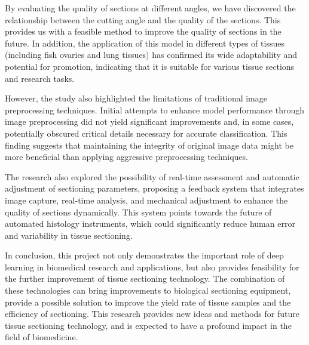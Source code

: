 By evaluating the quality of sections at different angles, we have discovered the relationship between the cutting angle and the quality of the sections. This provides us with a feasible method to improve the quality of sections in the future. In addition, the application of this model in different types of tissues (including fish ovaries and lung tissues) has confirmed its wide adaptability and potential for promotion, indicating that it is suitable for various tissue sections and research tasks.

However, the study also highlighted the limitations of traditional image preprocessing techniques. Initial attempts to enhance model performance through image preprocessing did not yield significant improvements and, in some cases, potentially obscured critical details necessary for accurate classification. This finding suggests that maintaining the integrity of original image data might be more beneficial than applying aggressive preprocessing techniques.

The research also explored the possibility of real-time assessment and automatic adjustment of sectioning parameters, proposing a feedback system that integrates image capture, real-time analysis, and mechanical adjustment to enhance the quality of sections dynamically. This system points towards the future of automated histology instruments, which could significantly reduce human error and variability in tissue sectioning.

In conclusion, this project not only demonstrates the important role of deep learning in biomedical research and applications, but also provides feasibility for the further improvement of tissue sectioning technology. The combination of these technologies can bring improvements to biological sectioning equipment, provide a possible solution to improve the yield rate of tissue samples and the efficiency of sectioning. This research provides new ideas and methods for future tissue sectioning technology, and is expected to have a profound impact in the field of biomedicine.


\FloatBarrier %